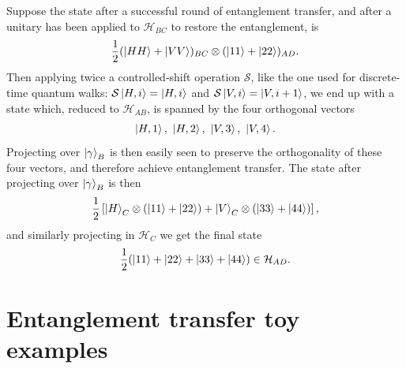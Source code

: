 \documentclass[
	aps, pra,
	superscriptaddress, twocolumn,
	floatfix,
	10pt
]{revtex4-1}
\newcommand{\parTitle}[1]{\noindent{\color{Mahogany}(\emph{#1})}}
\newcommand{\calH}{{\mathcal{H}}}
\newcommand{\calS}{{\mathcal{S}}}
\begin{document}
\parTitle{Example 1} Suppose the state after a successful round of entanglement transfer, and after a unitary has been applied to $\calH_{BC}$ to restore the entanglement, is
\begin{equation}
    \frac12 (\ket{HH} + \ket{VV})_{BC} \otimes (\ket{11} + \ket{22})_{AD}.
\end{equation}
Then applying twice a controlled-shift operation $\calS$, like the one used for discrete-time quantum walks: $\calS\ket{H,i}=\ket{H,i}$ and $\calS\ket{V,i}=\ket{V,i+1}$, we end up with a state which, reduced to $\calH_{AB}$, is spanned by the four orthogonal vectors
\begin{equation}
    \ket{H,1}, \,\,\ket{H,2}, \,\,\ket{V,3}, \,\,\ket{V,4}.
\end{equation}
Projecting over $\ket{\gamma}_B$ is then easily seen to preserve the orthogonality of these four vectors, and therefore achieve entanglement transfer.
The state after projecting over $\ket{\gamma}_B$ is then
\begin{equation}
    \frac12\left[
        \ket{H}_C\otimes(\ket{11}+\ket{22}) +
        \ket{V}_C\otimes(\ket{33} + \ket{44})
    \right],
\end{equation}
and similarly projecting in $\calH_C$ we get the final state
\begin{equation}
    \frac12 (\ket{11} + \ket{22} + \ket{33} + \ket{44}) \in\calH_{AD}.
\end{equation}

\appendix

\section{Entanglement transfer toy examples}
\end{document}

